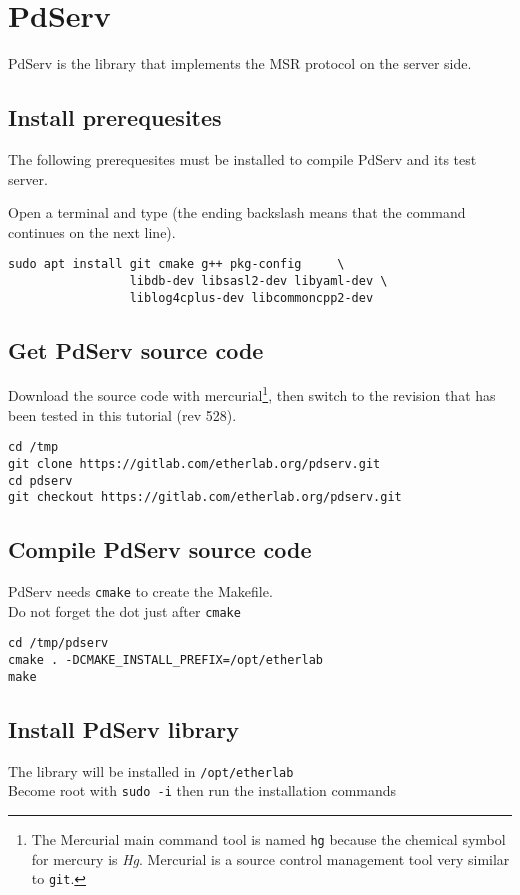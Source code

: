 \chapter{PdServ}


PdServ is the library that implements the MSR protocol on the server side.

\section{Install prerequesites}

The following prerequesites must be installed to compile PdServ and its test
server.

\noindent Open a terminal and type (the ending backslash means that
the command continues on the next line).
\begin{verbatim}
sudo apt install git cmake g++ pkg-config     \
                 libdb-dev libsasl2-dev libyaml-dev \
                 liblog4cplus-dev libcommoncpp2-dev
\end{verbatim}


\section{Get PdServ source code}
Download the source code with mercurial\footnote{The Mercurial main
  command tool is named \texttt{hg} because the chemical symbol for
  mercury is \emph{Hg}. Mercurial is a source control management tool
  very similar to \texttt{git}.}, then switch to the revision that has
been tested in this tutorial (rev 528).

\begin{verbatim}
cd /tmp
git clone https://gitlab.com/etherlab.org/pdserv.git
cd pdserv
git checkout https://gitlab.com/etherlab.org/pdserv.git
\end{verbatim}

\section{Compile PdServ source code}

PdServ needs \texttt{cmake} to create the Makefile.\\
Do not forget the dot just after \texttt{cmake}
\begin{verbatim}
cd /tmp/pdserv
cmake . -DCMAKE_INSTALL_PREFIX=/opt/etherlab
make
\end{verbatim}


\section{Install PdServ library}
The library will be installed in \texttt{/opt/etherlab} \\
Become root with \texttt{sudo -i} then run the installation commands

